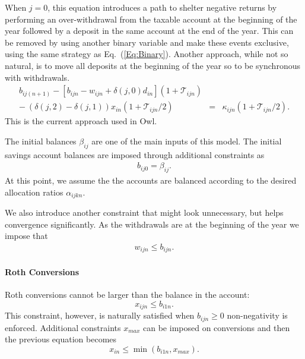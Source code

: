 \documentclass{report}[fleqn,12pt]
\begin{document}
	When $j=0$, this equation introduces
	a path to shelter negative returns by performing an over-withdrawal from the taxable
	account at the beginning of the year followed by a deposit in the
	same account at the end of the year. This can 
	be removed by using another binary variable and make these events exclusive, using
	the same strategy as Eq.~(\ref{Eq:Binary}). Another approach, while not so natural,
	is to move all deposits at the beginning of the year so to be synchronous with withdrawals.
	\begin{eqnarray}
		\label{Eq:C3b}
		b_{ij(n+1)} - [b_{ijn} - w_{ijn} + \delta(j, 0)d_{in} 
		] (1 + \mathcal{T}_{ijn})
		&& \nonumber \\
		- \ (\delta(j, 2) - \delta(j, 1))x_{in}(1 + \mathcal{T}_{ijn}/2)
		&=& \kappa_{ijn} (1 + \mathcal{T}_{ijn}/2).
	\end{eqnarray}
	This is the current approach used in Owl.

	The initial balances $\beta_{ij}$ are one of the main inputs of this model.
	The initial savings account balances are imposed through additional constraints as
	\begin{eqnarray}
		\label{Eq:InitialBalance}
		b_{ij0} = \beta_{ij}.
	\end{eqnarray}
	At this point, we assume the the accounts are balanced according to the desired
	allocation ratios $\alpha_{ijkn}$.

	We also introduce another constraint that might look unnecessary, but helps
	convergence significantly. As the withdrawals are at the beginning of the year
	we impose that
	\begin{eqnarray}
		w_{ijn} \le b_{ijn}.
	\end{eqnarray}

\paragraph*{Roth Conversions}
	Roth conversions cannot be larger than the balance in the account:
	\begin{equation}
		x_{ijn} \le b_{i1n}.
	\end{equation}
	This constraint, however, is naturally satisfied when $b_{ijn} \ge 0$ non-negativity is enforced.
	Additional constraints $x_{max}$ can be imposed on conversions and then the previous equation
	becomes
	\begin{equation}
		x_{in} \le \min(b_{i1n}, x_{max}).
	\end{equation}
\end{document}
